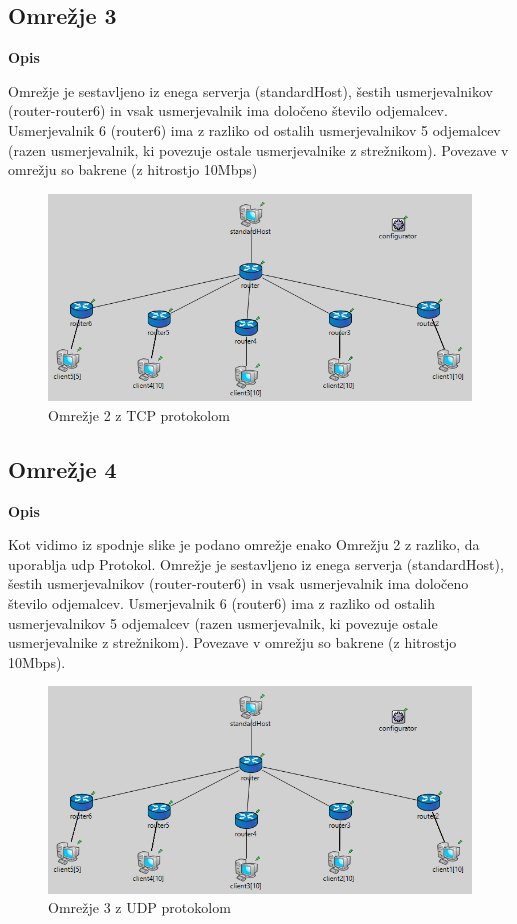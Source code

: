 \documentclass[11pt, a4paper, slovene]{book}
\begin{document}
\subsection{Omrežje 3}
\large \bf Opis 
\normalfont \normalsize

Omrežje je sestavljeno iz enega serverja (standardHost), šestih usmerjevalnikov (router-router6) in vsak usmerjevalnik ima določeno število odjemalcev. Usmerjevalnik 6 (router6) ima z razliko od ostalih usmerjevalnikov 5 odjemalcev (razen usmerjevalnik, ki povezuje ostale usmerjevalnike z strežnikom). Povezave v omrežju so bakrene (z hitrostjo 10Mbps)

\begin{figure}[h]
	\centering
	\includegraphics[width=\textwidth]{server_client.png}
	\caption{Omrežje 2 z TCP protokolom}
	\label{omrezje2}	
\end{figure}
\pagebreak
\subsection{Omrežje 4}
\large \bf Opis 
\normalfont \normalsize

Kot vidimo iz spodnje slike je podano omrežje enako Omrežju 2 z razliko, da uporablja udp Protokol. Omrežje je sestavljeno iz enega serverja (standardHost), šestih usmerjevalnikov (router-router6) in vsak usmerjevalnik ima določeno število odjemalcev. Usmerjevalnik 6 (router6) ima z razliko od ostalih usmerjevalnikov 5 odjemalcev (razen usmerjevalnik, ki povezuje ostale usmerjevalnike z strežnikom). Povezave v omrežju so bakrene (z hitrostjo 10Mbps).

\begin{figure}[h]
	\centering
	\includegraphics[width=\textwidth]{server_client.png}
	\caption{Omrežje 3 z UDP protokolom}
	\label{omrezje3}	
\end{figure}
\end{document}
